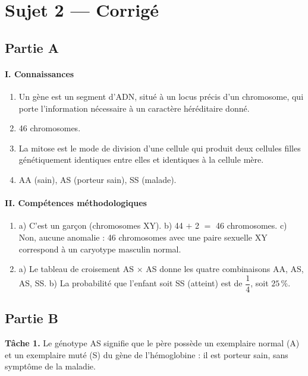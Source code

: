 \section{Sujet 2 — Corrigé}

\subsection*{Partie A}

\paragraph{I. Connaissances}
\begin{enumerate}[label=\arabic*)]
\item Un gène est un segment d'ADN, situé à un locus précis d'un chromosome, qui
porte l'information nécessaire à un caractère héréditaire donné.
\item 46 chromosomes.
\item La mitose est le mode de division d'une cellule qui produit deux cellules
filles génétiquement identiques entre elles et identiques à la cellule mère.
\item AA (sain), AS (porteur sain), SS (malade).
\end{enumerate}

\paragraph{II. Compétences méthodologiques}
\begin{enumerate}[label=\arabic*)]
\item a) C'est un garçon (chromosomes XY). b) 44 $+$ 2 $=$ 46 chromosomes. c) Non,
aucune anomalie : 46 chromosomes avec une paire sexuelle XY correspond à un caryotype
masculin normal.
\item a) Le tableau de croisement AS $\times$ AS donne les quatre combinaisons AA,
AS, AS, SS. b) La probabilité que l'enfant soit SS (atteint) est de $\dfrac14$, soit
$25\,\%$.
\end{enumerate}

\subsection*{Partie B}

\textbf{Tâche 1.} Le génotype AS signifie que le père possède un exemplaire normal
(A) et un exemplaire muté (S) du gène de l'hémoglobine : il est porteur sain, sans
symptôme de la maladie.

